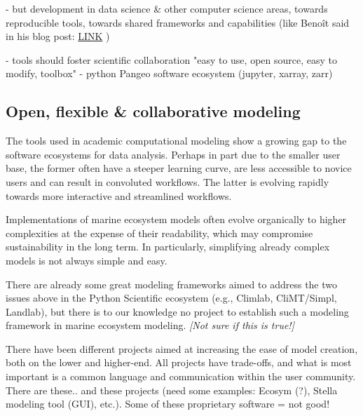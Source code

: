 \documentclass[journal abbreviation, manuscript]{copernicus}
\begin{document}
- but development in data science \& other computer science areas, towards reproducible tools, towards shared frameworks and capabilities (like Benoît said in his blog post: \href{https://medium.com/pangeo/pangeo-data-and-models-280b251ff0cd}{LINK} )

- tools should foster scientific collaboration
"easy to use, open source, easy to modify, toolbox"
- python Pangeo software ecosystem (jupyter, xarray, zarr)


\subsection{Open, flexible \& collaborative modeling}



The tools used in academic computational modeling show a growing gap to the software ecosystems for data analysis. Perhaps in part due to the smaller user base, the former often have a steeper learning curve, are less accessible to novice users and can result in convoluted workflows. The latter is evolving rapidly towards more interactive and streamlined workflows.

Implementations of marine ecosystem models often evolve organically to higher complexities at the expense of their readability, which may compromise sustainability in the long term. In particularly, simplifying already complex models is not always simple and easy.

There are already some great modeling frameworks aimed to address the two issues above in the Python Scientific ecosystem (e.g., Climlab, CliMT/Simpl, Landlab), but there is to our knowledge no project to establish such a modeling framework in marine ecosystem modeling. \textit{[Not sure if this is true!]}

There have been different projects aimed at increasing the ease of model creation, both on the lower and higher-end. All projects have trade-offs, and what is most important is a common language and communication within the user community.
There are these.. and these projects (need some examples: Ecosym (?), Stella modeling tool (GUI), etc.).
Some of these proprietary software = not good!
\end{document}
